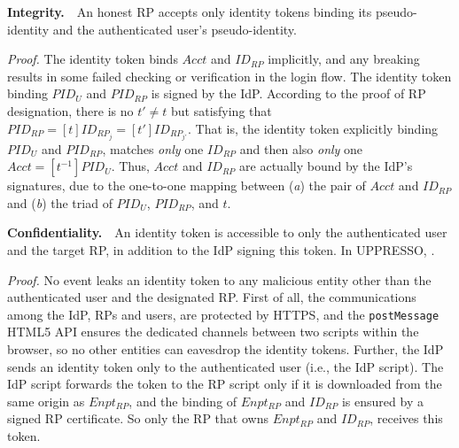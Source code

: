 %

\vspace{1mm}
\noindent\textbf{Integrity.}~~An honest RP accepts only identity tokens binding its pseudo-identity and the authenticated user's pseudo-identity.

\vspace{0.5mm}
\noindent\emph{Proof.}
The identity token binds $Acct$ and $ID_{RP}$ implicitly,
    and any breaking results in some failed checking or verification in the login flow.
The identity token binding $PID_U$ and $PID_{RP}$ is signed by the IdP.
According to the proof of RP designation,
    there is no $t' \neq t$ but satisfying that $PID_{RP} = [t]ID_{RP_j} = [t']ID_{RP_{j'}}$.
That is, the identity token explicitly binding $PID_U$ and $PID_{RP}$,
    matches \emph{only} one $ID_{RP}$ and then also \emph{only} one $Acct = [t^{-1}]PID_{U}$.
Thus,
    $Acct$ and $ID_{RP}$ are actually bound by the IdP's signatures,
        due to the one-to-one mapping between (\emph{a}) the pair of $Acct$ and $ID_{RP}$ and (\emph{b}) the triad of $PID_U$, $PID_{RP}$, and $t$.



\vspace{1mm}
\noindent\textbf{Confidentiality.}~~An identity token
    is accessible to only
                the authenticated user and the target RP, in addition to the IdP signing this token.
In UPPRESSO, .

\vspace{0.5mm}
\noindent\emph{Proof.}
No event leaks an identity token to any malicious entity other than the authenticated user and the designated RP.
First of all, the communications among the IdP, RPs and users,
    are protected by HTTPS,
    and the \verb+postMessage+ HTML5 API ensures the dedicated channels between two scripts within the browser,
    so no other entities can eavesdrop the identity tokens.
Further, the IdP sends an identity token only to the authenticated user
        (i.e., the IdP script).
The IdP script forwards the token to the RP script
 only if it is downloaded from the same origin as $Enpt_{RP}$,
and the binding of $Enpt_{RP}$ and $ID_{RP}$ is ensured by a signed RP certificate.
So only the RP that owns $Enpt_{RP}$ and $ID_{RP}$,
    receives this token.


